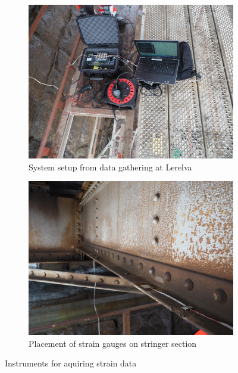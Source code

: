 \begin{figure}[H]
	\centering
	\begin{subfigure}[t]{0.49\textwidth}
    \centering
    \includegraphics[width=\textwidth]{figures/system_setup}
		\caption{System setup from data gathering at Lerelva}
		\label{fig:instruments}
	\end{subfigure}
	\begin{subfigure}[t]{0.49\textwidth}
    \centering
    \includegraphics[width=\textwidth]{figures/sensor_placement}
		\caption{Placement of strain gauges on stringer section}
		\label{fig:strain_gauges}
	\end{subfigure}
	\caption{Instruments for aquiring strain data}
	\label{fig:system_setup}
\end{figure}
